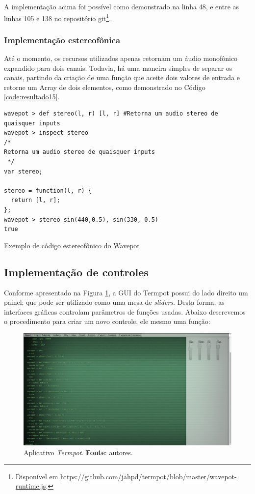 A implementação acima foi possível como demonstrado na linha 48, e entre as linhas 105 e 138 no repositório git\footnote{Disponível em \url{https://github.com/jahpd/termpot/blob/master/wavepot-runtime.js}.}.

\subsubsection*{Implementação estereofônica}

Até o momento, os recursos utilizados apenas retornam um áudio monofônico expandido para dois canais.
Todavia, há uma maneira simples de separar os canais, partindo da criação de uma função que aceite dois valores de entrada e retorne um Array de dois elementos, como demonstrado no Código \ref{code:resultado15}.

\begin{listing}
\begin{verbatim}
wavepot > def stereo(l, r) [l, r] #Retorna um audio stereo de 
quaisquer inputs
wavepot > inspect stereo
/*
Retorna um audio stereo de quaisquer inputs
 */
var stereo;

stereo = function(l, r) {
  return [l, r];
};
wavepot > stereo sin(440,0.5), sin(330, 0.5)
true
\end{verbatim}
\caption{Exemplo de código estereofônico do Wavepot}
\label{code:resultado15}
\end{listing}

\subsection{Implementação de controles}

Conforme apresentado na Figura \ref{fig:termpot}, a GUI do Termpot possui do lado direito um painel; que pode ser utilizado como uma mesa de \emph{sliders}.
Desta forma, as interfaces gráficas controlam parâmetros de funções usadas.
Abaixo descrevemos o procedimento para criar um novo controle, ele mesmo uma função:

\begin{figure}[!h]
\centering
\includegraphics[scale=0.35]{termpot.png}
\caption{Aplicativo \emph{Termpot}. \textbf{Fonte}: autores.}
\label{fig:termpot}
\end{figure}

